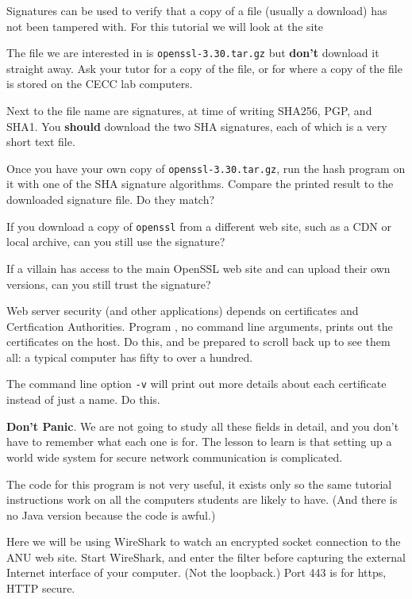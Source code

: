 \STEP Signatures can be used to verify that a copy of a file (usually a download)
has not been tampered with. For this tutorial we will look at the site

The file we are interested in is \texttt{openssl-3.30.tar.gz} but \textbf{don't}
download it straight away. Ask your tutor for a copy of the file, or for where
a copy of the file is stored on the CECC lab computers.

Next to the file name are signatures, at time of writing SHA256, PGP, and SHA1.
You \textbf{should} download the two SHA signatures, each of which is a very
short text file.

Once you have your own copy of \texttt{openssl-3.30.tar.gz}, run the hash
program on it with one of the SHA signature algorithms. Compare the printed
result to the downloaded signature file. Do they match?

If you download a copy of \texttt{openssl} from a different web site, such
as a CDN or local archive, can you still use the signature?

If a villain has access to the main OpenSSL web site and can upload their
own versions, can you still trust the signature?



\STEP Web server security (and other applications) depends on certificates
and Certfication Authorities. Program ,
no command line arguments, prints out the certificates on the host.
Do this, and be prepared to scroll back up to see them all: a typical computer
has fifty to over a hundred.

\STEP The command line option \texttt{-v} will print out more details about
each certificate instead of just a name. Do this.

\textbf{Don't Panic}. We are not going to study all these fields in detail,
and you don't have to remember what each one is for. The lesson to learn
is that setting up a world wide system for secure network communication is
complicated.

The code for this program is not very useful, it exists only so the same
tutorial instructions work on all the computers students are likely to have.
(And there is no Java version because the code is awful.)



Here we will be using WireShark to watch an encrypted socket connection
to the ANU web site. Start WireShark, and enter the filter
before capturing the external Internet interface of your computer. (Not the
loopback.) Port 443 is for https, HTTP secure.


